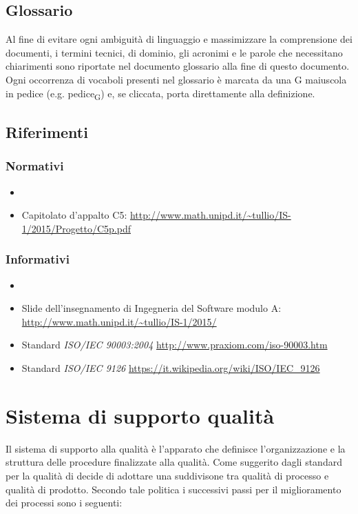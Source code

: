 \documentclass[12pt,a4paper]{article}
\begin{document}
\subsection{Glossario}
Al fine di evitare ogni ambiguità di linguaggio e massimizzare la comprensione dei documenti, i termini tecnici, di dominio, gli acronimi e le parole che necessitano chiarimenti sono riportate nel documento glossario alla fine di questo documento. Ogni occorrenza di vocaboli presenti nel glossario è marcata da una G maiuscola in pedice (e.g. pedice\textsubscript{G}) e, se cliccata, porta direttamente alla definizione.

\subsection{Riferimenti}
\subsubsection{Normativi}
\begin{itemize}
	\item \NdP
     \item Capitolato d'appalto C5: \url{http://www.math.unipd.it/~tullio/IS-1/2015/Progetto/C5p.pdf}
\end{itemize}
\subsubsection{Informativi}
\begin{itemize}
	\item \PdP
     \item Slide dell'insegnamento di Ingegneria del Software modulo A: \url{http://www.math.unipd.it/~tullio/IS-1/2015/}
\item Standard \textit{ISO/IEC 90003:2004} \url{http://www.praxiom.com/iso-90003.htm}
\item Standard \textit{ISO/IEC 9126} \url{https://it.wikipedia.org/wiki/ISO/IEC_9126}
\end{itemize}
\newpage
\section{Sistema di supporto qualità}
Il sistema di supporto alla qualità è l'apparato che definisce l'organizzazione e la struttura delle procedure finalizzate alla qualità. Come suggerito dagli standard per la qualità di decide di adottare una suddivisone tra qualità di processo e qualità di prodotto. Secondo tale politica i successivi passi per il miglioramento dei processi sono i seguenti: 
\end{document}
